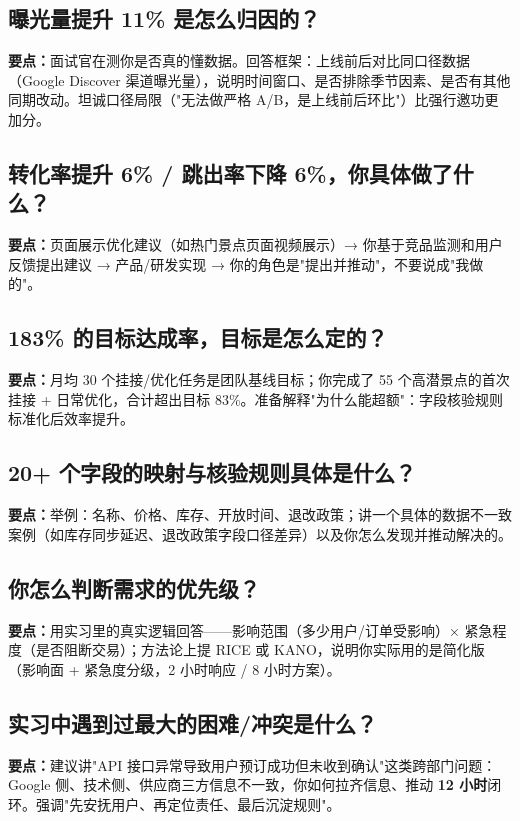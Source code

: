 \documentclass[zihao=-4,autoindent=2em]{ctexart}
\begin{document}
\subsection{曝光量提升 11\% 是怎么归因的？}
\textbf{要点：}面试官在测你是否真的懂数据。回答框架：上线前后对比同口径数据（Google Discover 渠道曝光量），说明时间窗口、是否排除季节因素、是否有其他同期改动。坦诚口径局限（"无法做严格 A/B，是上线前后环比"）比强行邀功更加分。

\subsection{转化率提升 6\% / 跳出率下降 6\%，你具体做了什么？}
\textbf{要点：}页面展示优化建议（如热门景点页面视频展示）→ 你基于竞品监测和用户反馈提出建议 → 产品/研发实现 → 你的角色是"提出并推动"，不要说成"我做的"。

\subsection{183\% 的目标达成率，目标是怎么定的？}
\textbf{要点：}月均 30 个挂接/优化任务是团队基线目标；你完成了 55 个高潜景点的首次挂接 + 日常优化，合计超出目标 83\%。准备解释"为什么能超额"：字段核验规则标准化后效率提升。

\subsection{20+ 个字段的映射与核验规则具体是什么？}
\textbf{要点：}举例：名称、价格、库存、开放时间、退改政策；讲一个具体的数据不一致案例（如库存同步延迟、退改政策字段口径差异）以及你怎么发现并推动解决的。

\subsection{你怎么判断需求的优先级？}
\textbf{要点：}用实习里的真实逻辑回答——影响范围（多少用户/订单受影响）× 紧急程度（是否阻断交易）；方法论上提 RICE 或 KANO，说明你实际用的是简化版（影响面 + 紧急度分级，2 小时响应 / 8 小时方案）。

\subsection{实习中遇到过最大的困难/冲突是什么？}
\textbf{要点：}建议讲"API 接口异常导致用户预订成功但未收到确认"这类跨部门问题：Google 侧、技术侧、供应商三方信息不一致，你如何拉齐信息、推动 \textbf{12 小时}闭环。强调"先安抚用户、再定位责任、最后沉淀规则"。
\end{document}
